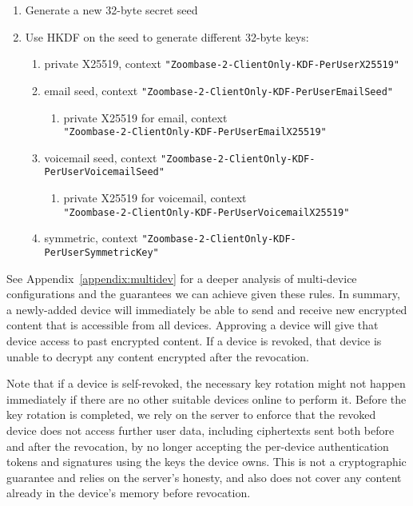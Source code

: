\begin{enumerate}
\item
Generate a new 32-byte secret seed
\item
Use HKDF on the seed to generate different 32-byte keys:
\begin{enumerate}
\item
private X25519, context \texttt{"Zoombase-2-ClientOnly-KDF-PerUserX25519"}
\item
email seed, context \texttt{"Zoombase-2-ClientOnly-KDF-PerUserEmailSeed"}
\begin{enumerate}
\item
  private X25519 for email, context \\ \texttt{"Zoombase-2-ClientOnly-KDF-PerUserEmailX25519"}
\end{enumerate}
\item
voicemail seed, context \texttt{"Zoombase-2-ClientOnly-KDF-PerUserVoicemailSeed"}
\begin{enumerate}
\item
  private X25519 for voicemail, context  \\
  \texttt{"Zoombase-2-ClientOnly-KDF-PerUserVoicemailX25519"}
\end{enumerate}
\item
symmetric, context \texttt{"Zoombase-2-ClientOnly-KDF-PerUserSymmetricKey"}
\end{enumerate}
\end{enumerate}


See Appendix~\ref{appendix:multidev} for a deeper analysis of multi-device configurations and the
guarantees we can achieve given these rules. In summary, a newly-added device will immediately be
able to send and receive new encrypted content that is accessible from all devices. Approving a
device will give that device access to past encrypted content. If a device is revoked, that device
is unable to decrypt any content encrypted after the revocation.

Note that if a device is self-revoked, the necessary key rotation might not happen immediately if
there are no other suitable devices online to perform it. Before the key rotation is completed, we
rely on the server to enforce that the revoked device does not access further user data, including
ciphertexts sent both before and after the revocation, by no longer accepting the per-device
authentication tokens and signatures using the keys the device owns. This is not a cryptographic
guarantee and relies on the server's honesty, and also does not cover any content already in the
device's memory before revocation.

